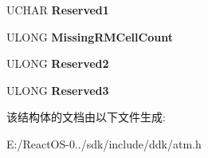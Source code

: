 \begin{DoxyCompactItemize}
U\+C\+H\+AR {\bfseries Reserved1}
\item 
\mbox{\label{struct___a_t_m___f_l_o_w___p_a_r_a_m_e_t_e_r_s_a79b616bf6d6c5c655d5a2e8b5ae8598a}} 
U\+L\+O\+NG {\bfseries Missing\+R\+M\+Cell\+Count}
\item 
\mbox{\label{struct___a_t_m___f_l_o_w___p_a_r_a_m_e_t_e_r_s_a9e3155899454642d6ce9fbc5a9fd625d}} 
U\+L\+O\+NG {\bfseries Reserved2}
\item 
\mbox{\label{struct___a_t_m___f_l_o_w___p_a_r_a_m_e_t_e_r_s_aaff82f5e6df2f45052373017690d6531}} 
U\+L\+O\+NG {\bfseries Reserved3}
\end{DoxyCompactItemize}


该结构体的文档由以下文件生成\+:\begin{DoxyCompactItemize}
\item 
E\+:/\+React\+O\+S-\/0../sdk/include/ddk/atm.\+h\end{DoxyCompactItemize}
